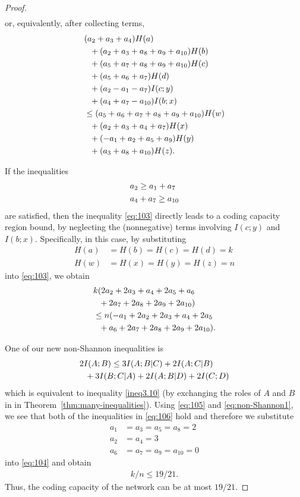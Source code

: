 \documentclass[10pt,journal]{IEEEtran}
\begin{document}
\begin{proof}
\begin{align*}
\end{align*}
%
or, equivalently, after collecting terms,
%
\begin{align}
& (a_2+a_3+a_4) H(a) \notag\\
&\ \ + (a_2+a_3+a_8+a_9+a_{10}) H(b) \notag\\
&\ \ + (a_5+a_7+a_8+a_9+a_{10}) H(c) \notag\\
&\ \ + (a_5+a_6+a_7) H(d) \notag\\
&\ \ + (a_2-a_1-a_7) I(c;y) \notag\\
&\ \ + (a_4+a_7-a_{10}) I(b;x)\notag\\
&\le
(a_5+a_6+a_7+a_8+a_9+a_{10}) H(w) \notag\\
&\ \ + (a_2+a_3+a_4+a_7) H(x) \notag\\
&\ \ + (-a_1+a_2+a_5+a_9) H(y) \notag\\
&\ \ + (a_3+a_8+a_{10}) H(z).
 \label{eq:103}
\end{align}
%

If the inequalities
%
\begin{align}
&a_2 \ge a_1 + a_7\notag\\
&a_4 + a_7 \ge a_{10}
\label{eq:106}
\end{align}
%
are satisfied,
then the inequality \eqref{eq:103} directly leads to a
\Vamos{} coding capacity region bound,
by neglecting the (nonnegative) terms involving $I(c;y)$ and $I(b;x)$.
Specifically, in this case,
by substituting
%
\begin{align*}
H(a)&=H(b)=H(c)=H(d)=k\\
H(w)&=H(x)=H(y)=H(z)=n
\end{align*}
%
into \eqref{eq:103},
we obtain
%
\begin{align}
&k (
2a_2
+ 2a_3
+ a_4
+ 2a_5
+ a_6\notag\\
&\ \
+ 2a_7
+ 2a_8
+ 2a_9
+ 2a_{10}
)\notag\\
&\le
n(
-a_1
+ 2a_2
+ 2a_3
+ a_4
+ 2a_5\notag\\
&\ \
+ a_6
+ 2a_7
+ 2a_8
+ 2a_9
+ 2a_{10}
).
 \label{eq:104}
\end{align}
%

One of our new non-Shannon inequalities is
%
\begin{align}
&2I(A;B) \le 3I(A;B|C) + 2I(A;C|B)\notag\\
&\ \ + 3I(B;C|A) + 2I(A;B|D) + 2I(C;D)
\label{eq:non-Shannon1}
\end{align}
%
which is equivalent to inequality \eqref{ineq3.10}
(by exchanging the roles of $A$ and $B$ in in Theorem~\ref{thm:many-inequalities}).
%
Using \eqref{eq:105} and \eqref{eq:non-Shannon1},
we see that both of the inequalities in \eqref{eq:106} hold
and therefore we substitute
%
\begin{align*}
a_1 &= a_3 = a_5 = a_8 = 2\\
a_2 &= a_4 = 3\\
a_6 &= a_7 = a_9 = a_{10} = 0
\end{align*}
%
into \eqref{eq:104} and obtain
%
\begin{align}
k/n \le 19/21.
\label{eq:107}
\end{align}
%
Thus, the coding capacity of the \Vamos{} network can be at most $19/21$.
\end{proof}
\end{document}
